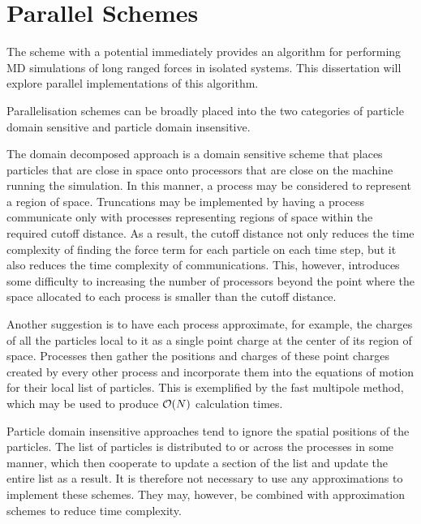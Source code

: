 \section{Parallel Schemes}

%
The \velocityverlet{} scheme with a \twobody{} potential
immediately provides an algorithm for
performing MD simulations of long ranged forces in isolated systems.
%
This dissertation will explore parallel implementations of this algorithm.

%
Parallelisation schemes can be broadly placed into the two categories
of particle domain sensitive and particle domain insensitive.

The domain decomposed approach is a domain sensitive scheme
that places particles that are
close in space onto processors that are close on the machine running
the simulation.
%
In this manner, a process may be considered to represent a region of space.
%
Truncations may be implemented by having a process communicate
only with processes representing regions of space within the required
cutoff distance.
%
As a result, the cutoff distance not only reduces the time complexity
of finding the force term for each particle on each time step,
but it also reduces the time complexity of communications.
%
This, however, introduces some difficulty to increasing the number
of processors beyond the point where the space allocated to
each process is smaller than the cutoff distance.

Another suggestion is to have each process approximate, for example,
the charges of all the particles local to it as a single point charge
at the center of its region of space.
%
Processes then gather the positions and charges of these point charges
created by every other process and incorporate them into the equations
of motion for their local list of particles.
%
This is exemplified by the fast multipole method, which may be used
to produce $\mathcal{O}{\left({ N }\right)}$ calculation times.


Particle domain insensitive approaches tend to ignore the spatial positions
of the particles.
%
The list of particles is distributed to or across  the processes in some manner,
which then cooperate to update a section of the list and update
the entire list as a result.
%
It is therefore not necessary to use any approximations to
implement these schemes.
%
They may, however, be combined with approximation schemes to reduce
time complexity.

